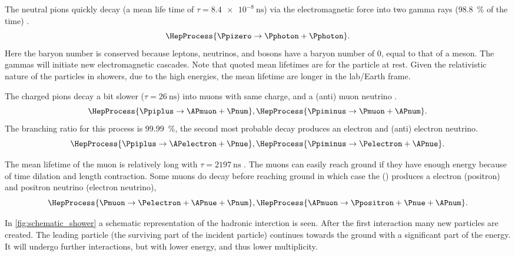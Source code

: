 The neutral pions quickly decay (a mean life time of $\tau = \SI{8.4e-8}{\ns}$) via the electromagnetic force into two gamma rays (\SI{98.8}{\percent} of the time) \cite{olive2014pdg}.
%
\begin{equation}
    \HepProcess{\Ppizero \to \Pphoton + \Pphoton}.
\end{equation}
%
Here the baryon number is conserved because leptons, neutrinos, and bosons have a baryon number of 0, equal to that of a meson. The gammas will initiate new electromagnetic cascades. Note that quoted mean lifetimes are for the particle at rest. Given the relativistic nature of the particles in showers, due to the high energies, the mean lifetime are longer in the lab/Earth frame.

The charged pions decay a bit slower ($\tau = \SI{26}{\ns}$) into muons with same charge, and a (anti) muon neutrino \cite{olive2014pdg}.
%
\begin{equation}
    \HepProcess{\Ppiplus \to \APmuon + \Pnum},
    \HepProcess{\Ppiminus \to \Pmuon + \APnum}.
\end{equation}
%
The branching ratio for this process is \SI{99.99}{\percent}, the second most probable decay produces an electron and (anti) electron neutrino.
%
\begin{equation}
    \HepProcess{\Ppiplus \to \APelectron + \Pnue},
    \HepProcess{\Ppiminus \to \Pelectron + \APnue}.
\end{equation}

The mean lifetime of the muon is relatively long with $\tau = \SI{2197}{\ns}$ \cite{duclos1973muon}. The muons can easily reach ground if they have enough energy because of time dilation and length contraction. Some muons do decay before reaching ground in which case the \Pmuon (\APmuon) produces a electron (positron) and positron neutrino (electron neutrino),
%
\begin{equation}
    \HepProcess{\Pmuon \to \Pelectron + \APnue + \Pnum}, \\
    \HepProcess{\APmuon \to \Ppositron + \Pnue + \APnum}.
\end{equation}

In \cref{fig:schematic_shower} a schematic representation of the hadronic interction is seen. After the first interaction many new particles are created. The leading particle (the surviving part of the incident particle) continues towards the ground with a significant part of the energy. It will undergo further interactions, but with lower energy, and thus lower multiplicity.

